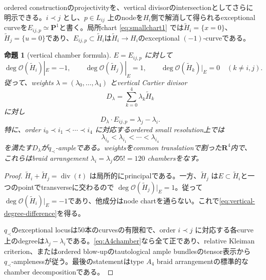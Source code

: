 \documentclass[11pt,a4paper]{ltjsarticle}
\newtheorem{proposition}[theorem]{命題}
\theoremstyle{definition}
\theoremstyle{remark}
\newcommand{\PP}{\mathbf P}
\newcommand{\RR}{\mathbf R}
\begin{document}
ordered constructionのprojectivityを、vertical divisorのintersectionとしてさらに明示できる。$i\prec j$ とし、$p\in L_{ij}$ 上のnodeを$H_i$側で解消して得られるexceptional curveを$E_{ij,p}\simeq\PP^1$と書く。局所chart \eqref{eq:smallchart1} では$\widetilde H_i=\{x=0\}$、$\widetilde H_j=\{u=0\}$であり、$E_{ij,p}\subset\widetilde H_i$は$\widetilde H_i\to H_i$のexceptional $(-1)$-curveである。

\begin{proposition}[vertical chamber formula]\label{prop:A4chambers}
$E=E_{ij,p}$ に対して
\begin{equation}\label{eq:component-degrees-on-E}
 \deg\mathcal O(\widetilde H_i)|_E=-1,\qquad
 \deg\mathcal O(\widetilde H_j)|_E=1,\qquad
 \deg\mathcal O(\widetilde H_k)|_E=0\quad(k\ne i,j).
\end{equation}
従って、weights $\lambda=(\lambda_0,\dots,\lambda_4)$ とvertical Cartier divisor
\[
 D_\lambda=\sum_{k=0}^4\lambda_k\widetilde H_k
\]
に対し
\begin{equation}\label{eq:vertical-degree-difference}
 D_\lambda\cdot E_{ij,p}=\lambda_j-\lambda_i.
\end{equation}
特に、order $i_0\prec i_1\prec\cdots\prec i_4$ に対応するordered small resolution上では
\begin{equation}\label{eq:A4chamber}
 \lambda_{i_0}<\lambda_{i_1}<\cdots<\lambda_{i_4}
\end{equation}
を満たす$D_\lambda$が$q_\prec$-ampleである。weightsをcommon translationで割った$\RR^4$内で、これらはbraid arrangement
$\lambda_i=\lambda_j$の$5!=120$ chambersをなす。
\end{proposition}

\begin{proof}
$\widetilde H_i+\widetilde H_j=\operatorname{div}(t)$ は局所的にprincipalである。一方、$\widetilde H_j$ は$E\subset\widetilde H_i$と一つのpointでtransverseに交わるので
$\deg\mathcal O(\widetilde H_j)|_E=1$。従って
$\deg\mathcal O(\widetilde H_i)|_E=-1$であり、他成分はnode chartを通らない。これで\eqref{eq:vertical-degree-difference}を得る。

$q_\prec$のexceptional locusは50本のcurvesの有限和で、order $i\prec j$ に対応する各curve上のdegreeは$\lambda_j-\lambda_i$である。\eqref{eq:A4chamber}なら全て正であり、relative Kleiman criterion、またはordered blow-upのtautological ample bundlesのtensor表示から$q_\prec$-amplenessが従う。最後のstatementはtype $A_4$ braid arrangementの標準的なchamber decompositionである。
\end{proof}
\end{document}
